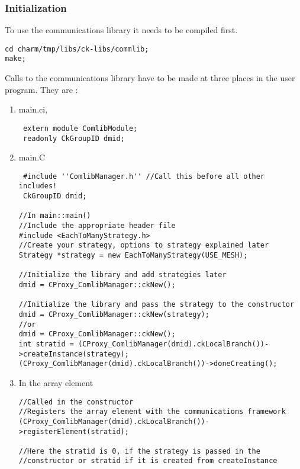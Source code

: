 \subsubsection{Initialization}

To use the communications library it needs to be compiled first.

\begin{verbatim}
cd charm/tmp/libs/ck-libs/commlib;
make;
\end{verbatim}

Calls to the communications library have to be made at three places in
the user program. They are :

\begin{enumerate}

\item main.ci, \\
\begin{verbatim}
 extern module ComlibModule; 
 readonly CkGroupID dmid; 
\end{verbatim}

\item main.C \\
\begin{verbatim}
 #include ''ComlibManager.h'' //Call this before all other includes!
 CkGroupID dmid; 

//In main::main() 
//Include the appropriate header file
#include <EachToManyStrategy.h>
//Create your strategy, options to strategy explained later
Strategy *strategy = new EachToManyStrategy(USE_MESH);

//Initialize the library and add strategies later
dmid = CProxy_ComlibManager::ckNew(); 

//Initialize the library and pass the strategy to the constructor
dmid = CProxy_ComlibManager::ckNew(strategy); 
//or 
dmid = CProxy_ComlibManager::ckNew(); 
int stratid = (CProxy_ComlibManager(dmid).ckLocalBranch())->createInstance(strategy);
(CProxy_ComlibManager(dmid).ckLocalBranch())->doneCreating();
\end{verbatim}

\item In the array element \\
\begin{verbatim}
//Called in the constructor
//Registers the array element with the communications framework
(CProxy_ComlibManager(dmid).ckLocalBranch())->registerElement(stratid);

//Here the stratid is 0, if the strategy is passed in the 
//constructor or stratid if it is created from createInstance


\end{verbatim}
\end{enumerate}
